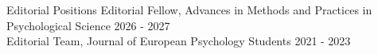 \documentclass{resume} %
\begin{document}







\begin{rSection}{Editorial Positions}
Editorial Fellow, Advances in Methods and Practices in Psychological Science \hfill 2026 - 2027\\
Editorial Team, Journal of European Psychology Students \hfill 2021 - 2023
\end{rSection}
\end{document}
